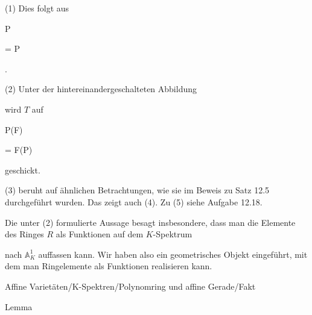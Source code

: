 {


(1) Dies folgt aus


\mavergleichskette

{\vergleichskette

{
 \circ P
}

{ = }{ P
}

{  }{
}

{    }{
}

{   }{
}

}
{}{}{.}


(2) Unter der hintereinandergeschalteten Abbildung


 {  }


wird $T$ auf


\mavergleichskette

{\vergleichskette

{ P(F)
}

{ = }{ F(P)
}

{  }{
}

{    }{
}

{   }{
}

}
{}{}{}
geschickt.


(3) beruht auf ähnlichen Betrachtungen, wie sie im Beweis zu
Satz 12.5
durchgeführt wurden. Das zeigt auch (4). Zu (5) siehe
Aufgabe 12.18.


}


Die unter (2) formulierte Aussage besagt insbesondere, dass man die Elemente des Ringes $R$ als Funktionen auf dem $K$-Spektrum

 nach ${\mathbb A}^{1}_{ K }$ auffassen kann. Wir haben also ein geometrisches Objekt eingeführt, mit dem man Ringelemente als Funktionen realisieren kann.





{Affine Varietäten/K-Spektren/Polynomring und affine Gerade/Fakt}

{Lemma}

{}

{


\faktsituation {}



\faktzusatz {}

\faktzusatz {}


}

